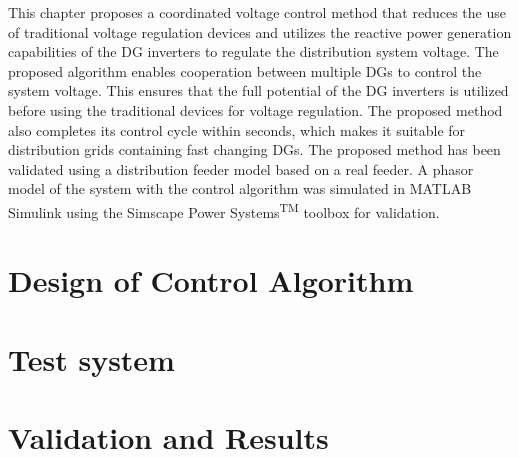 
This chapter proposes a coordinated voltage control method that reduces the use of traditional voltage regulation devices and utilizes the reactive power generation capabilities of the DG inverters to regulate the distribution system voltage. The proposed algorithm enables cooperation between multiple DGs to control the system voltage. This ensures that the full potential of the DG inverters is utilized before using the traditional devices for voltage regulation. The proposed method also completes its control cycle within seconds, which makes it suitable for distribution grids containing fast changing DGs. The proposed method has been validated using a distribution feeder model based on a real feeder. A phasor model of the system with the control algorithm was simulated in MATLAB\textsuperscript{\textregistered} Simulink\textsuperscript{\textregistered} using the Simscape Power Systems\textsuperscript{TM} toolbox for validation.


\section{Design of Control Algorithm}\label{sec:design}


\section{Test system}


\section{Validation and Results}\label{sec:val}

